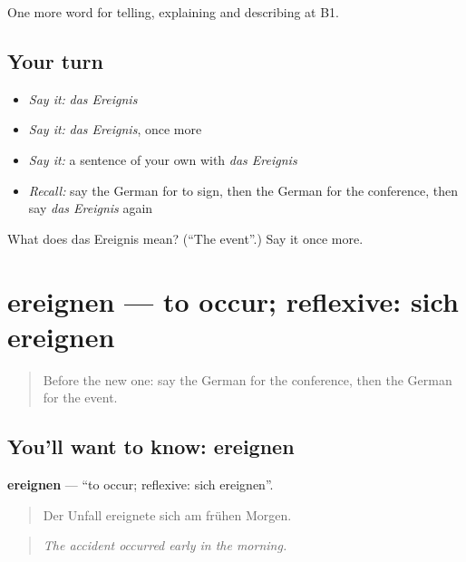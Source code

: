 \begin{grammarlens}[title={What you've built}]
One more word for telling, explaining and describing at B1.
\end{grammarlens}

\subsection*{Your turn}
\begin{itemize}
\raggedright
  \item \emph{Say it:} \emph{das Ereignis}
  \item \emph{Say it:} \emph{das Ereignis}, once more
  \item \emph{Say it:} a sentence of your own with \emph{das Ereignis}
  \item \emph{Recall:} say the German for to sign, then the German for the conference, then say \emph{das Ereignis} again
\end{itemize}

\begin{tcolorbox}[breakable,colback=teal!4,colframe=teal!35!black,title={Before you move on}]
What does das Ereignis mean? (\textquotedblleft{}The event\textquotedblright{}.) Say it once more.
\end{tcolorbox}
\section[ereignen]{ereignen — to occur; reflexive: sich ereignen}

\label{lesson:GE-C279-ereignen}



\begin{quote}
Before the new one: say the German for the conference, then the German for the event.
\end{quote}

\subsection*{You'll want to know: ereignen}
\textbf{ereignen} — \textquotedblleft{}to occur; reflexive: sich ereignen\textquotedblright{}.

\begin{quote}
Der Unfall ereignete sich am frühen Morgen.
\end{quote}

\begin{quote}
\emph{The accident occurred early in the morning.}
\end{quote}

